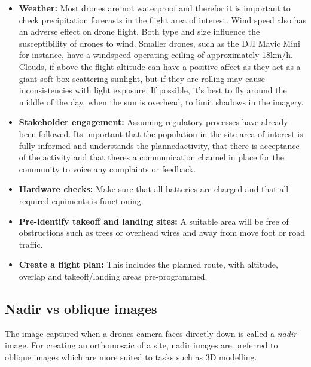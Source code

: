\documentclass[
  a4paper,
  onecolumn,
  oneside]{book}
\begin{document}
\begin{itemize}
\item
  \textbf{Weather:} Most drones are not waterproof and therefor it is
  important to check precipitation forecasts in the flight area of
  interest. Wind speed also has an adverse effect on drone flight. Both
  type and size influence the susceptibility of drones to wind. Smaller
  drones, such as the DJI Mavic Mini for instance, have a windspeed
  operating ceiling of approximately 18km/h. Clouds, if above the flight
  altitude can have a positive affect as they act as a giant soft-box
  scattering sunlight, but if they are rolling may cause inconsistencies
  with light exposure. If possible, it's best to fly around the middle
  of the day, when the sun is overhead, to limit shadows in the imagery.
\item
  \textbf{Stakeholder engagement:} Assuming regulatory processes have
  already been followed. Its important that the population in the site
  area of interest is fully informed and understands the
  plannedactivity, that there is acceptance of the activity and that
  theres a communication channel in place for the community to voice any
  complaints or feedback.
\item
  \textbf{Hardware checks:} Make sure that all batteries are charged and
  that all required equiments is functioning.
\item
  \textbf{Pre-identify takeoff and landing sites:} A suitable area will
  be free of obstructions such as trees or overhead wires and away from
  move foot or road traffic.
\item
  \textbf{Create a flight plan:} This includes the planned route, with
  altitude, overlap and takeoff/landing areas pre-programmed.
\end{itemize}

\hypertarget{nadir-vs-oblique-images}{%
\subsection{Nadir vs oblique images}\label{nadir-vs-oblique-images}}

The image captured when a drones camera faces directly down is called a
\emph{nadir} image. For creating an orthomosaic of a site, nadir images
are preferred to oblique images which are more suited to tasks such as
3D modelling.
\end{document}
